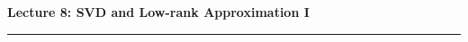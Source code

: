 \documentclass[10pt, twocolumn]{article}
\theoremstyle{definition}
\theoremstyle{plain}
\begin{document}
\noindent
\begin{minipage}{\linewidth}
    \centering
    \textbf{\Large Lecture 8: SVD and Low-rank Approximation I} \\[0.5em]
    \hrule
\end{minipage}
\vspace{1em}

\end{document}
